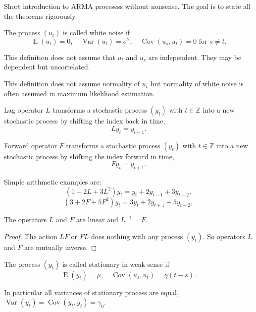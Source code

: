 \documentclass[12pt]{article} %
\DeclareMathOperator{\Cov}{Cov}
\DeclareMathOperator{\Var}{Var}
\DeclareMathOperator{\E}{E}
\def \ZZ{\mathbb{Z}}
\begin{document}
Short introduction to ARMA procesess without nonsense. 
The goal is to state all the theorems rigorously. 

\begin{definition}
The process $(u_t)$ is called white noise if 
\[
\E(u_t) = 0, \quad \Var(u_t) = \sigma^2, \quad \Cov(u_s, u_t) = 0 \text{ for } s\neq t.    
\]
\end{definition}

This definition does not assume that $u_t$ and $u_s$ are independent. 
They may be dependent but uncorrelated. 

This definition does not assume normality of $u_t$ but normality of white noise 
is often assumed in maximum likelihood estimation. 

\begin{definition}
    Lag operator $L$ transforms a stochastic process $(y_t)$ with $t\in \ZZ$ into a 
    new stochastic process by shifting the index back in time,
    \[
            L y_t = y_{t-1}.
    \]
\end{definition}

\begin{definition}
    Forward operator $F$ transforms a stochastic process $(y_t)$ with $t\in \ZZ$ into a 
    new stochastic process by shifting the index forward in time,
    \[
            F y_t = y_{t+1}.
    \]
\end{definition}


Simple arithmetic examples are:
\[
(1 + 2L + 3L^2)y_t = y_t + 2y_{t-1} + 3y_{t-2},   
\]
\[
(3 + 2F + 5F^2)y_t = 3y_t + 2y_{t+1} + 5y_{t+2},
\]

\begin{theorem}
    The operators $L$ and $F$ are linear and $L^{-1} = F$.
\end{theorem}

\begin{proof}
 The action $LF$ or $FL$ does nothing with any process $(y_t)$. 
 So operators $L$ and $F$ are mutually inverse.
\end{proof}


\begin{definition}
    The process $(y_t)$ is called stationary in weak sense if 
    \[
    \E(y_t) = \mu, \quad \Cov(u_s, u_t) = \gamma(t - s).    
    \]
\end{definition}

In particular all variances of stationary process are equal, $\Var(y_t) = \Cov(y_t, y_t) = \gamma_0$.
\end{document}
